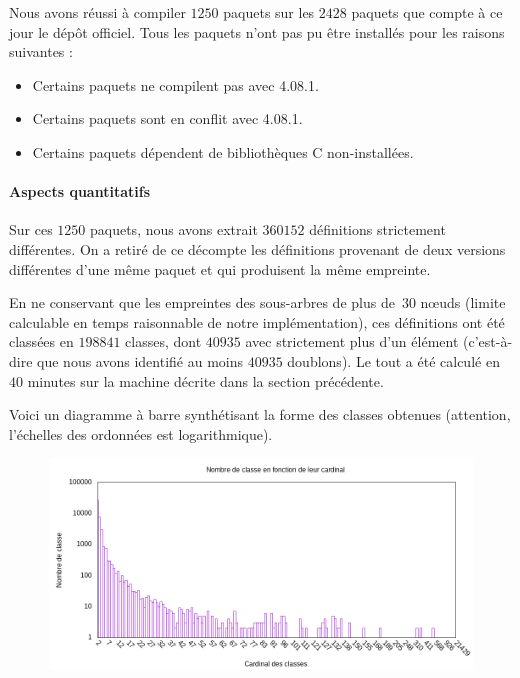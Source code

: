 Nous avons réussi à compiler $1250$ paquets sur les $2428$ paquets que
compte à ce jour le dépôt {\Opam} officiel. Tous les paquets n'ont pas
pu être installés pour les raisons suivantes :

\begin{itemize}
\item Certains paquets ne compilent pas avec {\OCaml} 4.08.1.
\item Certains paquets sont en conflit avec {\OCaml} 4.08.1.
\item Certains paquets dépendent de bibliothèques C non-installées.
\end{itemize}

\paragraph{Aspects quantitatifs}

Sur ces $1250$ paquets, nous avons extrait $360152$ définitions
strictement différentes. On a retiré de ce décompte les définitions
provenant de deux versions différentes d'une même paquet et qui
produisent la même empreinte.

En ne conservant que les empreintes des sous-arbres de plus de~$30$ nœuds
(limite calculable en temps raisonnable de notre implémentation), ces
définitions ont été classées en $198841$ classes, dont $40935$ avec
strictement plus d'un élément (c'est-à-dire que nous avons identifié
au moins $40935$ doublons). Le tout a été calculé en $40$ minutes sur
la machine décrite dans la section précédente.

Voici un diagramme à barre synthétisant la forme des classes obtenues (attention, l'échelles des ordonnées est logarithmique).

\begin{figure}[h]
	\includegraphics[scale=0.6]{figures/bars.png}
\end{figure}

